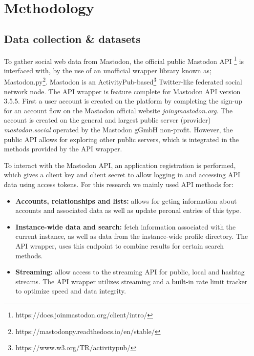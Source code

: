 \section{Methodology}
\subsection{Data collection & datasets}
To gather social web data from Mastodon, the official public Mastodon API \footnote{https://docs.joinmastodon.org/client/intro/} is interfaced with, by the use of an unofficial wrapper library known as; Mastodon.py\footnote{https://mastodonpy.readthedocs.io/en/stable/}.
Mastodon is an ActivityPub-based\footnote{https://www.w3.org/TR/activitypub/} Twitter-like federated social network node.
The API wrapper is feature complete for Mastodon API version 3.5.5.
First a user account is created on the platform by completing the sign-up for an account flow on the Mastodon official website \textit{joingmastodon.org}.
The account is created on the general and largest public server (provider) \textit{mastodon.social} operated by the Mastodon gGmbH non-profit.
However, the public API allows for exploring other public servers, which is integrated in the methods provided by the API wrapper.

To interact with the Mastodon API, an application registration is performed, which gives a client key and client secret to allow logging in and accessing API data using access tokens.
For this research we mainly used API methods for:
\begin{itemize}
  \item \textbf{Accounts, relationships and lists:} allows for geting information about accounts and associated data as well as update peronal entries of this type.
  \item \textbf{Instance-wide data and search:} fetch information associated with the current instance, as well as data from the instance-wide profile directory. 
  The API wrapper, uses this endpoint to combine results for certain search methods.
  \item \textbf{Streaming:} allow access to the streaming API for public, local and hashtag streams.
  The API wrapper utilizes streaming and a built-in rate limit tracker to optimize speed and data integrity.
\end{itemize}

